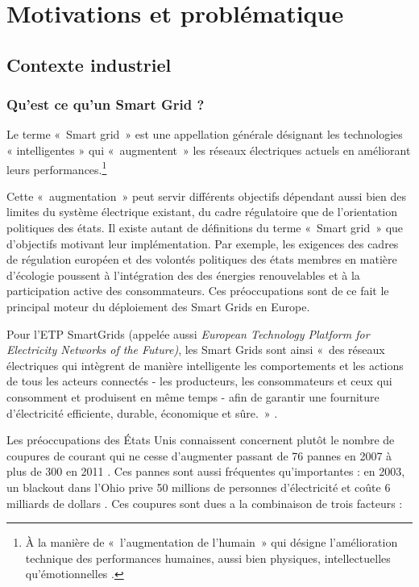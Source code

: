 \chapter{Motivations et problématique}
\label{ch:problematique}

\section{Contexte industriel}

\subsection{Qu'est ce qu'un Smart Grid ?}
Le terme «~Smart grid~» est une appellation générale désignant les technologies 
« intelligentes » qui «~augmentent~» les réseaux électriques actuels en 
améliorant leurs performances.\footnote{À la manière de «~l'augmentation de 
l'humain~» qui désigne l'amélioration technique des performances humaines, aussi 
bien physiques, intellectuelles qu'émotionnelles \cite{le2013humain}.}

Cette «~augmentation~» peut servir différents objectifs dépendant aussi bien des 
limites du système électrique existant, du cadre régulatoire que de 
l'orientation politiques des états. Il existe autant de définitions du terme 
«~Smart grid~» que d'objectifs motivant leur implémentation. Par exemple, les 
exigences des cadres de régulation européen et des volontés politiques des états 
membres en matière d'écologie poussent à l'intégration des 
des énergies renouvelables et à la participation active des consommateurs. Ces 
préoccupations sont de ce fait le principal moteur du déploiement des Smart 
Grids en Europe. 

Pour l'ETP SmartGrids (appelée aussi \textit{European Technology Platform for 
Electricity Networks of the Future)}, les Smart Grids sont ainsi «~des réseaux 
électriques qui intègrent de manière intelligente les comportements et les 
actions de tous les acteurs connectés - les producteurs, les consommateurs et 
ceux qui consomment et produisent en même temps - afin de garantir une 
fourniture d'électricité efficiente, durable, économique et sûre.~» \cite{ETP}.

Les préoccupations des États Unis connaissent concernent plutôt le nombre de 
coupures de courant qui ne cesse d'augmenter passant de 76 pannes en 2007 à plus 
de 300 en 2011 
\cite{detroit}. Ces pannes sont aussi fréquentes qu'importantes : en 2003, un 
blackout dans l'Ohio prive 50 millions de personnes d'électricité et coûte 6 
milliards de dollars \cite{andersson2005causes}. Ces coupures sont dues a la 
combinaison de trois facteurs \cite{outages}:

